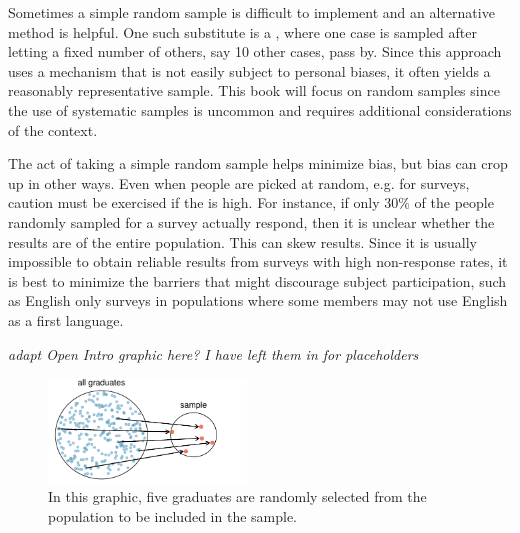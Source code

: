 \begin{doublespace}
Sometimes a simple random sample is difficult to implement and an alternative method is helpful. One such substitute is a , where one case is sampled after letting a fixed number of others, say 10 other cases, pass by. Since this approach uses a mechanism that is not easily subject to personal biases, it often yields a reasonably representative sample. This book will focus on random samples since the use of systematic samples is uncommon and requires additional considerations of the context.

The act of taking a simple random sample helps minimize bias, but bias can crop up in other ways. Even when
people are picked at random, e.g. for surveys, caution must be exercised if the 
 is high. For instance, if only 30\% of the people randomly sampled for a
survey actually respond, then it is unclear whether the results are  of the entire
population. This   can skew results. Since it
is usually impossible to obtain reliable results from surveys with high non-response rates, it is best to
minimize the barriers that might discourage subject participation, such as English only surveys in populations
where some members may not use English as a first language.

\textit{adapt Open Intro graphic here?  I have left them in for placeholders}







\begin{figure}[ht]
\centering
\includegraphics[width=0.47\textwidth]{ch_intro_to_data_oi_biostat/figures/popToSample/popToSampleGraduates}
\caption{In this graphic, five graduates are randomly selected from the population to be included in the sample.}
\label{popToSampleGraduates}
\end{figure}




\end{doublespace}
